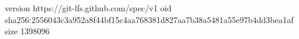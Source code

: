 version https://git-lfs.github.com/spec/v1
oid sha256:2556043c3a952a8f44bf15c4aa768381d827aa7b38a5481a55e97b4dd3bea1af
size 1398096
